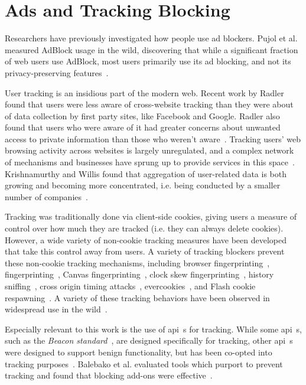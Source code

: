 \section{Ads and Tracking Blocking}
\label{background:ads-tracking-blocking}

Researchers have previously investigated how people use ad blockers.
Pujol et al. measured AdBlock usage in the wild, discovering that while a
significant fraction of web users use AdBlock, most users
primarily use its ad blocking, and not its privacy-preserving
features~\cite{pujolannoyed}.

User tracking is an insidious part of the modern web. Recent work by Radler
found that users were less aware of cross-website tracking than they were about
of data collection by first party sites, like Facebook and Google. Radler also
found that users who were aware of it had greater concerns about unwanted
access to private information than those who weren't
aware~\cite{rader2014awareness}.  Tracking users' web browsing activity across
websites is largely unregulated, and a complex network of mechanisms and
businesses have sprung up to provide services in this
space~\cite{falahrastegar2014anatomy}.  Krishnamurthy and Willis found that
aggregation of user-related data is both growing and becoming more
concentrated, i.e. being conducted by a smaller number of
companies~\cite{krishnamurthy2009privacy}.

Tracking was traditionally done via client-side cookies, giving users a measure
of control over how much they are tracked (i.e. they can always delete
cookies).  However, a wide variety of non-cookie tracking measures have been
developed that take this control away from users. A variety of tracking
blockers prevent these non-cookie tracking mechanisms, including browser
fingerprinting~\cite{eckersley2010unique}, \JS
fingerprinting~\cite{mowery2011fingerprinting,mulazzani2013fast}, Canvas
fingerprinting~\cite{mowery2012pixel}, clock skew
fingerprinting~\cite{kohno2005remote}, history
sniffing~\cite{jang2010empirical}, cross origin timing
attacks~\cite{van2015clock}, evercookies~\cite{evercookies}, and Flash cookie
respawning~\cite{soltani2010flash,ayenson2011flash}.  A variety of these
tracking behaviors have been observed in widespread use in the
wild~\cite{soltani2010flash,ayenson2011flash,acar2014web,nikiforakis2013cookieless,mcdonald2011survey,olejnik2014selling,sorensen2013zombie}.

Especially relevant to this work is the use of \JS \gls{api}~s for tracking.
While some \gls{api}~s, such as the \textit{Beacon standard}~\cite{beaconapi},
are designed specifically for tracking, other \gls{api}~s were designed to support
benign functionality, but has been co-opted into tracking
purposes~\cite{mowery2012pixel,fingerprintjs2}.  Balebako et al. evaluated
tools which purport to prevent tracking and found that blocking add-ons were
effective~\cite{balebako2012measuring}.
